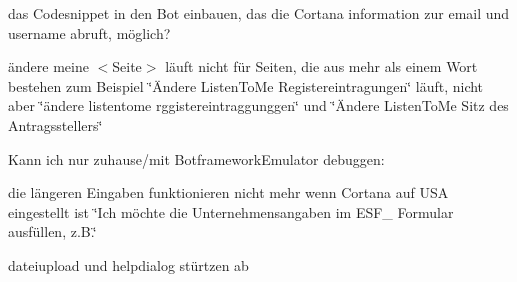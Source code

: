 \begin{DoxyItemize}
\item das Codesnippet in den Bot einbauen, das die Cortana information zur email und username abruft, möglich?
\item ändere meine $<$\+Seite$>$ läuft nicht für Seiten, die aus mehr als einem Wort bestehen zum Beispiel \char`\"{}Ändere Listen\+To\+Me Registereintragungen\char`\"{} läuft, nicht aber \char`\"{}ändere listentome rggistereintraggunggen\char`\"{} und \char`\"{}Ändere Listen\+To\+Me Sitz des Antragsstellers\char`\"{}
\end{DoxyItemize}

Kann ich nur zuhause/mit Botframework\+Emulator debuggen\+:
\begin{DoxyItemize}
\item die längeren Eingaben funktionieren nicht mehr wenn Cortana auf U\+SA eingestellt ist \char`\"{}\+Ich möchte die Unternehmensangaben im E\+S\+F\+\_ Formular ausfüllen, z.\+B.\char`\"{}
\item dateiupload und helpdialog stürtzen ab 
\end{DoxyItemize}